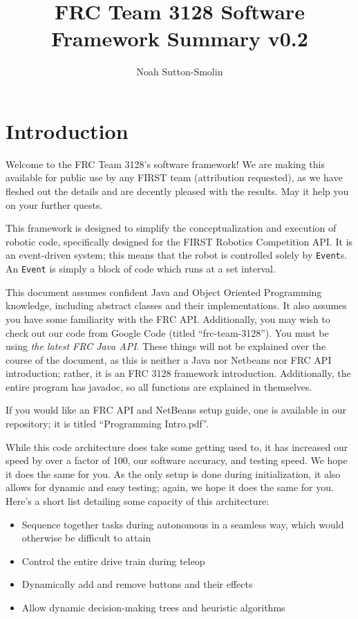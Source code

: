 \documentclass[a4paper]{article}
\title{FRC Team 3128 Software Framework Summary v0.2}
\author{Noah Sutton-Smolin}
\begin{document}
\maketitle\tableofcontents\pagebreak

\section{Introduction} Welcome to the FRC Team 3128's software framework! We are making this available for public use by any FIRST team (attribution requested), as we have fleshed out the details and are decently pleased with the results. May it help you on your further quests.

This framework is designed to simplify the conceptualization and execution of robotic code, specifically designed for the FIRST Robotics Competition API. It is an event-driven system; this means that the robot is controlled solely by \lstinline{Event}s. An \lstinline{Event} is simply a block of code which runs at a set interval. 

This document assumes confident Java and Object Oriented Programming knowledge, including abstract classes and their implementations. It also assumes you have some familiarity with the FRC API. Additionally, you may wish to check out our code from Google Code (titled ``frc-team-3128''). You must be using \textit{the latest FRC Java API}. These things will not be explained over the course of the document, as this is neither a Java nor Netbeans nor FRC API introduction; rather, it is an FRC 3128 framework introduction. Additionally, the entire program has javadoc, so all functions are explained in themselves.

If you would like an FRC API and NetBeans setup guide, one is available in our repository; it is titled ``Programming Intro.pdf''.

While this code architecture does take some getting used to, it has increased our speed by over a factor of 100, our software accuracy, and testing speed. We hope it does the same for you. As the only setup is done during initialization, it also allows for dynamic and easy testing; again, we hope it does the same for you. Here's a short list detailing some capacity of this architecture:

\begin{itemize}
	\item{Sequence together tasks during autonomous in a seamless way, which would otherwise be difficult to attain}
	\item{Control the entire drive train during teleop}
	\item{Dynamically add and remove buttons and their effects}
	\item{Allow dynamic decision-making trees and heuristic algorithms}
\end{itemize}
\end{document}
